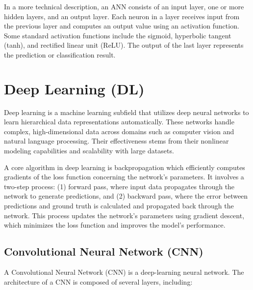 



In a more technical description, an ANN consists of an input layer, one or more hidden layers, and an output layer. Each neuron in a layer receives input from the previous layer and computes an output value using an activation function. Some standard activation functions include the sigmoid, hyperbolic tangent (tanh), and rectified linear unit (ReLU). The output of the last layer represents the prediction or classification result.





\section{Deep Learning (DL)}

Deep learning is a machine learning subfield that utilizes deep neural networks to learn hierarchical data representations automatically. These networks handle complex, high-dimensional data across domains such as computer vision and natural language processing. Their effectiveness stems from their nonlinear modeling capabilities and scalability with large datasets.

A core algorithm in deep learning is backpropagation which efficiently computes gradients of the loss function concerning the network's parameters. It involves a two-step process: (1) forward pass, where input data propagates through the network to generate predictions, and (2) backward pass, where the error between predictions and ground truth is calculated and propagated back through the network. This process updates the network's parameters using gradient descent, which minimizes the loss function and improves the model's performance.



\subsection{Convolutional Neural Network (CNN)}

A Convolutional Neural Network (CNN) is a deep-learning neural network. The architecture of a CNN is composed of several layers, including:

